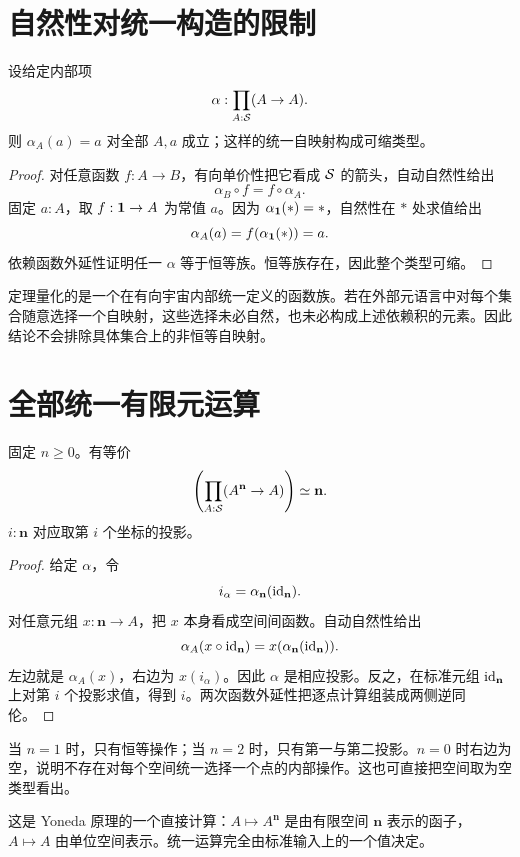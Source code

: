 \section{自然性对统一构造的限制}
\begin{theorem}[统一自映射必为恒等]\label{thm:polymorphic-id}
设给定内部项
\[
\alpha:\prod_{A:\mathcal S}(A\to A).
\]
则 $\alpha_A(a)=a$ 对全部 $A,a$ 成立；这样的统一自映射构成可缩类型。
\end{theorem}
\begin{proof}
对任意函数 $f:A\to B$，有向单价性把它看成 $\mathcal S$ 的箭头，自动自然性给出
\[
\alpha_B\circ f=f\circ\alpha_A.
\]
固定 $a:A$，取 $f:\mathbf 1\to A$ 为常值 $a$。因为 $\alpha_\mathbf 1(*)=*$，自然性在 $*$ 处求值给出
\[
\alpha_A(a)=f(\alpha_\mathbf 1(*))=a.
\]
依赖函数外延性证明任一 $\alpha$ 等于恒等族。恒等族存在，因此整个类型可缩。
\end{proof}
\begin{remark}
定理量化的是一个在有向宇宙内部统一定义的函数族。若在外部元语言中对每个集合随意选择一个自映射，这些选择未必自然，也未必构成上述依赖积的元素。因此结论不会排除具体集合上的非恒等自映射。
\end{remark}

\section{全部统一有限元运算}
\begin{theorem}[统一运算的投影分类]\label{thm:uniform-projections}
固定 $n\ge0$。有等价
\[
\left(\prod_{A:\mathcal S}(A^{\mathbf n}\to A)\right)
\simeq\mathbf n.
\]
$i:\mathbf n$ 对应取第 $i$ 个坐标的投影。
\end{theorem}
\begin{proof}
给定 $\alpha$，令
\[
i_\alpha=\alpha_{\mathbf n}(\operatorname{id}_{\mathbf n}).
\]
对任意元组 $x:\mathbf n\to A$，把 $x$ 本身看成空间间函数。自动自然性给出
\[
\alpha_A(x\circ\operatorname{id}_{\mathbf n})
=x(\alpha_{\mathbf n}(\operatorname{id}_{\mathbf n})).
\]
左边就是 $\alpha_A(x)$，右边为 $x(i_\alpha)$。因此 $\alpha$ 是相应投影。反之，在标准元组 $\operatorname{id}_{\mathbf n}$ 上对第 $i$ 个投影求值，得到 $i$。两次函数外延性把逐点计算组装成两侧逆同伦。
\end{proof}
\begin{example}
当 $n=1$ 时，只有恒等操作；当 $n=2$ 时，只有第一与第二投影。$n=0$ 时右边为空，说明不存在对每个空间统一选择一个点的内部操作。这也可直接把空间取为空类型看出。
\end{example}
\begin{remark}
这是 Yoneda 原理的一个直接计算：$A\mapsto A^{\mathbf n}$ 是由有限空间 $\mathbf n$ 表示的函子，$A\mapsto A$ 由单位空间表示。统一运算完全由标准输入上的一个值决定。
\end{remark}

